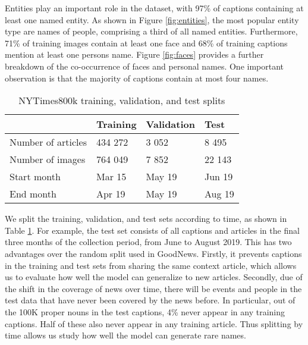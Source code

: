 Entities play an important role in the dataset, with 97\% of captions
containing at least one named entity. As shown in Figure \ref{fig:entities},
the most popular entity type are names of people, comprising a third of all
named entities. Furthermore, 71\% of training images contain at least one face
and 68\% of training captions mention at least one persons name. Figure
\ref{fig:faces} provides a further breakdown of the co-occurrence of faces and
personal names. One important observation is that the majority of captions
contain at most four names.


\begin{table}[t]
	\caption {NYTimes800k training, validation, and test splits}
	\label{tab:splits}
	\centering
	\begin{tabularx}{\linewidth}{lXXX}
		\toprule
		  & Training  &   Validation & Test \\
		\midrule
      Number of articles & 434 272 & 3 052 & 8 495 \\
      Number of images  & 764 049 & 7 852 & 22 143 \\
      Start month & Mar 15 & May 19 & Jun 19 \\
      End month & Apr 19 & May 19 & Aug 19 \\
		\bottomrule
	\end{tabularx}
\end{table}

We split the training, validation, and test sets according to time, as shown in
Table \ref{tab:splits}. For example, the test set consists of all captions and
articles in the final three months of the collection period, from June to
August 2019. This has two advantages over the random split used in GoodNews.
Firstly, it prevents captions in the training and test sets from sharing the
same context article, which allows us to evaluate how well the model can
generalize to new articles. Secondly, due of the shift in the coverage of news
over time, there
will be events and people in the test data that have never been covered by the
news
before. In particular, out of the 100K proper nouns in the test captions, 4\%
never appear in any training captions. Half of these also never appear in any
training article. Thus splitting by time allows us study how well the model can
generate rare names.
